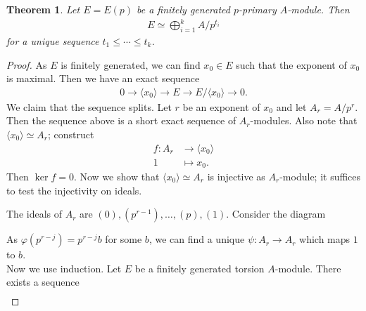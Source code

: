 \documentclass[12pt]{report}
\theoremstyle{plain}
\newtheorem{theorem}{Theorem}[section]
\theoremstyle{remark}
\theoremstyle{definition}
\begin{document}
\begin{theorem}
    Let $E=E(p)$ be a finitely generated $p$-primary $A$-module. Then
    \begin{align*}
        E\simeq \bigoplus_{i=1}^k A/p^{t_i}
    \end{align*}
    for a unique sequence $t_1\le \cdots\le t_k$.
\end{theorem}
\begin{proof}
    As $E$ is finitely generated, we can find $x_0\in E$ such that the exponent of $x_0$ is maximal. Then we have an exact sequence
    \begin{align*}
        0\to \langle x_0\rangle \to E\to E/\langle x_0\rangle \to 0.
    \end{align*}
    We claim that the sequence splits. Let $r$ be an exponent of $x_0$ and let $A_r=A/p^r$. Then the sequence above is a short exact sequence of $A_r$-modules. Also note that $\langle x_0\rangle \simeq A_r$; construct
    \begin{align*}
        f:A_r &\to \langle x_0 \rangle \\
        1&\mapsto x_0.
    \end{align*}
    Then $\ker f = 0$. Now we show that $\langle x_0\rangle\simeq A_r$ is injective as $A_r$-module; it suffices to test the injectivity on ideals.
    \begin{figure}[H]
        \centering
    \end{figure}
    \noindent The ideals of $A_r$ are $(0),(p^{r-1}),\dots,(p),(1)$. Consider the diagram
    \begin{figure}[H]
        \centering
    \end{figure}
    \noindent As $\varphi(p^{r-j})=p^{r-j}b$ for some $b$, we can find a unique $\psi:A_r\rightarrow A_r$ which maps $1$ to $b$. \\
    Now we use induction. Let $E$ be a finitely generated torsion $A$-module. There exists a sequence
    \begin{align*}

\end{align*}
\end{proof}
\end{document}
